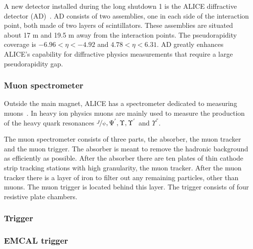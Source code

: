 A new detector installed during the long shutdown 1 is the ALICE diffractive detector (AD)~\cite{AD}. AD consists of two assemblies, one in each side of the interaction point, both made of two layers of scintillators. These assemblies are situated about 17 m and 19.5 m away from the interaction points. The pseudorapidity coverage is $-6.96 < \eta < -4.92 $ and $4.78 < \eta < 6.31$. AD greatly enhances ALICE's capability for diffractive physics measurements that require a large pseudorapidity gap.

\subsubsection{Muon spectrometer}
Outside the main magnet, ALICE has a spectrometer dedicated to measuring muons~\cite{MuonSpectro}. In heavy ion physics muons are mainly used to measure the production of the heavy quark resonances $\nicefrac{J}{\psi}, \Psi^{'}, \Upsilon, \Upsilon^{'}$ and $\Upsilon^{''}$.

The muon spectrometer consists of three parts, the absorber, the muon tracker and the muon trigger. The absorber is meant to remove the hadronic background as efficiently as possible. After the absorber there are ten plates of thin cathode strip tracking stations with high granularity, the muon tracker. After the muon tracker there is a layer of iron to filter out any remaining particles, other than muons. The muon trigger is located behind this layer. The trigger consists of four resistive plate chambers. 
\subsubsection{Trigger}
\subsubsection*{EMCAL trigger}

